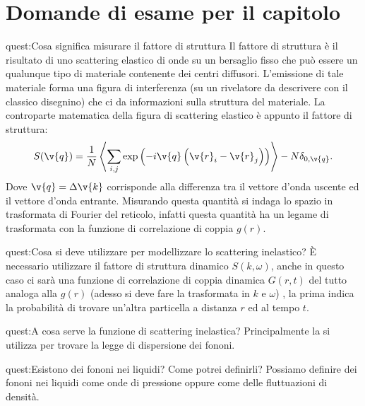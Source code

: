 \clearpage 
\section*{Domande di esame per il capitolo}%
\begin{quest}{quest:Cosa significa misurare il fattore di struttura}
    Il fattore di struttura è il risultato di uno scattering elastico di onde su un bersaglio fisso che può essere un qualunque tipo di materiale contenente dei centri diffusori. L'emissione di tale materiale forma una figura di interferenza (su un rivelatore da descrivere con il classico disegnino) che ci da informazioni sulla struttura del materiale. 
    La controparte matematica della figura di scattering elastico è appunto il fattore di struttura:
    \[
	S(\v{q}) = \frac{1}{N}\left<\sum_{i,j}^{} \exp\left(-i\v{q}\left(\v{r}_i-\v{r}_j\right)\right)\right> - N\delta_{0,\v{q}}
    .\] 
    Dove $\v{q}=\Delta\v{k}$ corrisponde alla differenza tra il vettore d'onda uscente ed il vettore d'onda entrante.
    Misurando questa quantità si indaga lo spazio in trasformata di Fourier del reticolo, infatti questa quantità ha un legame di trasformata con la funzione di correlazione di coppia $g(r)$.
\end{quest}
\begin{quest}{quest:Cosa si deve utilizzare per modellizzare lo scattering inelastico?}
    È necessario utilizzare il fattore di struttura dinamico $S(k,\omega)$, anche in questo caso ci sarà una funzione di correlazione di coppia dinamica $G(r,t)$ del tutto analoga alla $g(r)$ (adesso si deve fare la trasformata in $k$ e $\omega$) , la prima indica la probabilità di trovare un'altra particella a distanza $r$ ed al tempo $t$.
\end{quest}
\begin{quest}{quest:A cosa serve la funzione di scattering inelastica?}
Principalmente la si utilizza per trovare la legge di dispersione dei fononi.
\end{quest}
\begin{quest}{quest:Esistono dei fononi nei liquidi? Come potrei definirli?}
Possiamo definire dei fononi nei liquidi come onde di pressione oppure come delle fluttuazioni di densità.
\end{quest}


